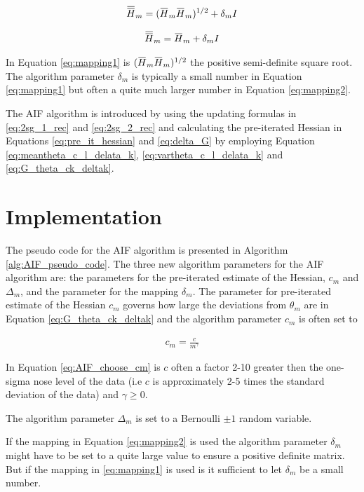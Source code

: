 \documentclass[twoside,openright]{report}
\newcommand{\overbar}[1]{\mkern 1.5mu\overline{\mkern-1.5mu#1\mkern-1.5mu}\mkern 1.5mu}
\begin{document}
\begin{align}
 \overbar{\overbar{H}}_{m} =  (\overbar{H}_m \overbar{H}_m )^{1/2} + \delta_m I
 \label{eq:mapping1}
\end{align}

\begin{align}
    \overbar{\overbar{H}}_{m} =  \overbar{H}_m + \delta_m I
    \label{eq:mapping2}
\end{align}

In Equation \ref{eq:mapping1} is $(\overbar{H}_m \overbar{H}_m )^{1/2} $ the positive semi-definite square root. The algorithm parameter $\delta_m$ is typically a small number in Equation \ref{eq:mapping1} but often a quite much larger number in Equation \ref{eq:mapping2}. 

The AIF algorithm is introduced by using the updating formulas in \ref{eq:2sg_1_rec} and \ref{eq:2sg_2_rec}  and calculating the pre-iterated Hessian in Equations \ref{eq:pre_it_hessian} and \ref{eq:delta_G} by employing Equation \ref{eq:meantheta_c_l_delata_k}, \ref{eq:vartheta_c_l_delata_k} and \ref{eq:G_theta_ck_deltak}. 


\section{Implementation}
The pseudo code for the AIF algorithm is presented in Algorithm \ref{alg:AIF_pseudo_code}. The three new algorithm parameters for the AIF algorithm are:  the parameters for the pre-iterated estimate of the Hessian, $c_m$ and $\Delta_m$, and the parameter for the mapping $\delta_m$. The parameter for pre-iterated estimate of the Hessian $c_m$ governs  how large the deviations from $\theta_m$ are in  Equation \ref{eq:G_theta_ck_deltak} and the algorithm parameter $c_m$ is often set to \cite{spall2000adaptive}

\begin{align} \label{eq:AIF_choose_cm}
    c_m = \frac{c}{m^{\gamma}}
\end{align}

In Equation \ref{eq:AIF_choose_cm} is $c$ often a factor 2-10 greater then the one-sigma nose level  of the data (i.e $c$ is approximately 2-5 times the standard deviation of the data) and $\gamma \geq 0$.    

The algorithm parameter $\Delta_m$ is set to a Bernoulli $\pm 1$ random variable. 

If the mapping in Equation \ref{eq:mapping2} is used the algorithm parameter $\delta_m$ might have to be set to a quite large value to ensure a positive definite matrix. But if the mapping in \ref{eq:mapping1} is used is it sufficient to let $\delta_m$ be a small number. 
\end{document}
